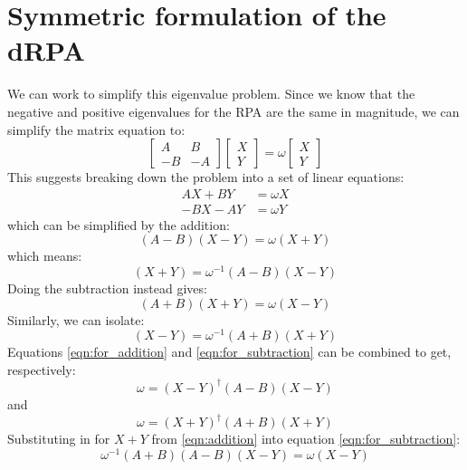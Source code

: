 \documentclass[12pt]{caltech_thesis}
\begin{document}
\chapter{Symmetric formulation of the dRPA}
\label{app:symm_drpa}
We can work to simplify this eigenvalue problem. Since we know that the negative and positive eigenvalues for the RPA are the same in magnitude, we can simplify the matrix equation to:
\begin{equation}
\begin{bmatrix}
A & B \\
-B & -A
\end{bmatrix}
\begin{bmatrix}
X \\
Y
\end{bmatrix}
= \omega
\begin{bmatrix}
X \\
Y
\end{bmatrix}
\end{equation}
This suggests breaking down the problem into a set of linear equations:
\begin{align}
    AX + BY &= \omega X\\
    -BX-AY &= \omega Y
\end{align}
which can be simplified by the addition:
\begin{equation}
    (A-B)(X-Y)= \omega (X+Y)
\label{eqn:for_addition}
\end{equation}
which means:
\begin{equation}
    (X+Y) = \omega^{-1}(A-B)(X-Y)
\label{eqn:addition}
\end{equation}
Doing the subtraction instead gives:
\begin{equation}
    (A+B)(X+Y)= \omega (X-Y)
\label{eqn:for_subtraction}
\end{equation}
Similarly, we can isolate:
\begin{equation}
    (X-Y) = \omega^{-1}(A+B)(X+Y)
\label{eqn:subtraction}
\end{equation}
Equations \ref{eqn:for_addition} and \ref{eqn:for_subtraction} can be combined to get, respectively:
\begin{equation}
    \boxed{\omega = (X-Y)^{\dag} (A-B)(X-Y)}
\end{equation}
and
\begin{equation}
    \boxed{\omega = (X+Y)^{\dag} (A+B)(X+Y)}
\end{equation}
Substituting in for $X+Y$ from \ref{eqn:addition} into equation \ref{eqn:for_subtraction}:
\begin{equation}
    \omega^{-1}(A+B)(A-B)(X-Y) = \omega (X-Y)
\end{equation}
\end{document}
